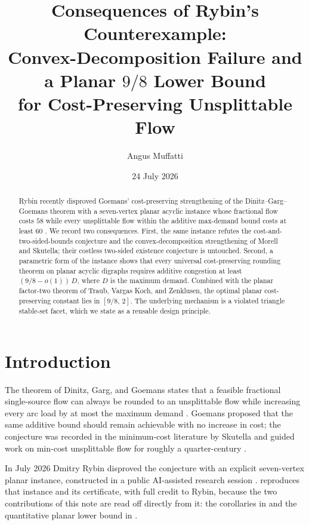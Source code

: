 \documentclass[11pt]{article}
\title{Consequences of Rybin's Counterexample:\\
Convex-Decomposition Failure and a Planar $9/8$ Lower Bound\\
for Cost-Preserving Unsplittable Flow}
\author{Angus Muffatti}
\date{24 July 2026}
\theoremstyle{definition}
\begin{document}
\maketitle

\begin{abstract}
Rybin recently disproved Goemans' cost-preserving strengthening of the
Dinitz--Garg--Goemans theorem with a seven-vertex planar acyclic instance
whose fractional flow costs $58$ while every unsplittable flow within the
additive max-demand bound costs at least $60$ \citep{Rybin2026}.  We record
two consequences.  First, the same instance refutes the
cost-and-two-sided-bounds conjecture and the convex-decomposition
strengthening of Morell and Skutella; their costless two-sided existence
conjecture is untouched.  Second, a parametric form of the instance shows
that every universal cost-preserving rounding theorem on planar acyclic
digraphs requires additive congestion at least $(9/8 - o(1))\,D$, where $D$
is the maximum demand.  Combined with the planar factor-two theorem of
Traub, Vargas Koch, and Zenklusen, the optimal planar cost-preserving
constant lies in $[9/8,\,2]$.  The underlying mechanism is a violated
triangle stable-set facet, which we state as a reusable design principle.
\end{abstract}

\section{Introduction}

The theorem of Dinitz, Garg, and Goemans states that a feasible fractional
single-source flow can always be rounded to an unsplittable flow while
increasing every arc load by at most the maximum demand
\cite{DinitzGargGoemans1999}.  Goemans proposed that the same additive bound
should remain achievable with no increase in cost; the conjecture was
recorded in the minimum-cost literature by Skutella \cite{Skutella2002} and
guided work on min-cost unsplittable flow for roughly a quarter-century
\cite{MartensSalazarSkutella2007,MorellSkutella2022,SwamyTraubVargasKochZenklusen2026}.

In July 2026 Dmitry Rybin disproved the conjecture with an explicit
seven-vertex planar instance, constructed in a public AI-assisted research
session \citep{Rybin2026}.   reproduces that instance and
its certificate, with full credit to Rybin, because the two contributions of
this note are read off directly from it: the corollaries in
 and the quantitative planar lower bound in
.
\end{document}
